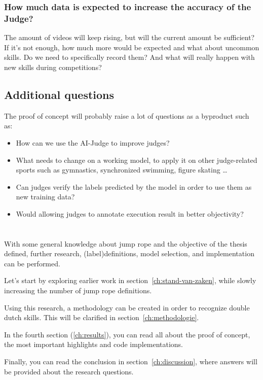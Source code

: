 \subsubsection{How much data is expected to increase the accuracy of the Judge?}
\label{intro-bp:question-expected-data-to-increase-accuracy}

The amount of videos will keep rising, but will the current amount be sufficient? If it's not enough, how much more would be expected and what about uncommon skills. Do we need to specifically record them? And what will really happen with new skills during competitions?

\subsection{Additional questions}
\label{intro-bp:question-additional}

The proof of concept will probably raise a lot of questions as a byproduct such as:

\begin{itemize}
    \item How can we use the AI-Judge to improve judges?
    \item What needs to change on a working model, to apply it on other judge-related sports such as gymnastics, synchronized swimming, figure skating \dots
    \item Can judges verify the labels predicted by the model in order to use them as new training data?
    \item Would allowing judges to annotate execution result in better objectivity?
\end{itemize}


\section{}%
\label{sec:opzet-bachelorproef}


With some general knowledge about jump rope and the objective of the thesis defined, further research, (label)definitions, model selection, and implementation can be performed.

Let’s start by exploring earlier work in section~\ref{ch:stand-van-zaken}, while slowly increasing the number of jump rope definitions.

Using this research, a methodology can be created in order to recognize double dutch skills. This will be clarified in section~\ref{ch:methodologie}.

In the fourth section (\ref{ch:results}), you can read all about the proof of concept, the most important highlights and code implementations.

Finally, you can read the conclusion in section~\ref{ch:discussion}, where answers will be provided about the research questions.
